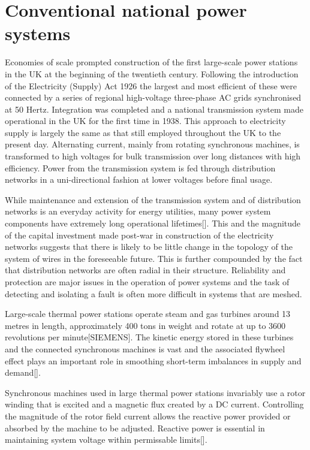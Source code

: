 \section{Conventional national power systems}
Economies of scale prompted construction of the first large-scale power
stations in the UK at the beginning of the twentieth century.  Following the
introduction of the Electricity (Supply) Act 1926 the largest and most
efficient of these were connected by a series of regional high-voltage
three-phase AC grids synchronised at 50 Hertz.  Integration was completed and
a national transmission system made operational in the UK for the first time
in 1938.  This approach to electricity supply is largely the same as that
still employed throughout the UK to the present day.  Alternating current,
mainly from rotating synchronous machines, is transformed to high voltages for
bulk transmission over long distances with high efficiency.  Power from the
transmission system is fed through distribution networks in a uni-directional
fashion at lower voltages before final usage.

While maintenance and extension of the transmission system and of distribution
networks is an everyday activity for energy utilities, many power system
components have extremely long operational lifetimes[].  This and the
magnitude of the capital investment made post-war in construction of the
electricity networks suggests that there is likely to be little change in the
topology of the system of wires in the foreseeable future.  This is further
compounded by the fact that distribution networks are often radial in their
structure.  Reliability and protection are major issues in the operation of
power systems and the task of detecting and isolating a fault is often more
difficult in systems that are meshed.

Large-scale thermal power stations operate steam and gas turbines around 13
metres in length, approximately 400 tons in weight and rotate at up to 3600
revolutions per minute[SIEMENS].  The kinetic energy stored in these turbines
and the connected synchronous machines is vast and the associated flywheel
effect plays an important role in smoothing short-term imbalances in supply
and demand[].

Synchronous machines used in large thermal power stations invariably use a
rotor winding that is excited and a magnetic flux created by a DC current.
Controlling the magnitude of the rotor field current allows the reactive power
provided or absorbed by the machine to be adjusted.  Reactive power is
essential in maintaining system voltage within permissable limits[].

